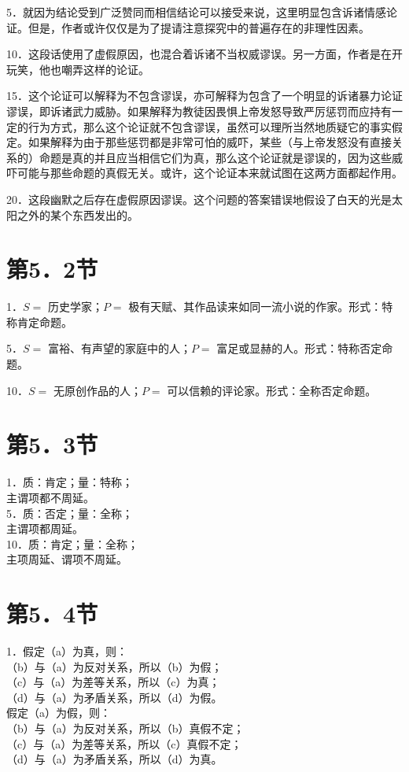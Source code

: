 5．就因为结论受到广泛赞同而相信结论可以接受来说，这里明显包含诉诸情感论证。但是，作者或许仅仅是为了提请注意探究中的普遍存在的非理性因素。

10．这段话使用了虚假原因，也混合着诉诸不当权威谬误。另一方面，作者是在开玩笑，他也嘲弄这样的论证。

15．这个论证可以解释为不包含谬误，亦可解释为包含了一个明显的诉诸暴力论证谬误，即诉诸武力威胁。如果解释为教徒因畏惧上帝发怒导致严厉惩罚而应持有一定的行为方式，那么这个论证就不包含谬误，虽然可以理所当然地质疑它的事实假定。如果解释为由于那些惩罚都是非常可怕的威吓，某些（与上帝发怒没有直接关系的）命题是真的并且应当相信它们为真，那么这个论证就是谬误的，因为这些威吓可能与那些命题的真假无关。或许，这个论证本来就试图在这两方面都起作用。

20．这段幽默之后存在虚假原因谬误。这个问题的答案错误地假设了白天的光是太阳之外的某个东西发出的。

\section*{第5．2节}
1．$S=$ 历史学家；$P=$ 极有天赋、其作品读来如同一流小说的作家。形式：特称肯定命题。

5．$S=$ 富裕、有声望的家庭中的人；$P=$ 富足或显赫的人。形式：特称否定命题。

10．$S=$ 无原创作品的人；$P=$ 可以信赖的评论家。形式：全称否定命题。

\section*{第5．3节}
1．质：肯定；量：特称；\\
主谓项都不周延。\\
5．质：否定；量：全称；\\
主谓项都周延。\\
10．质：肯定；量：全称；\\
主项周延、谓项不周延。

\section*{第5．4节}
1．假定（a）为真，则：\\
（b）与（a）为反对关系，所以（b）为假；\\
（c）与（a）为差等关系，所以（c）为真；\\
（d）与（a）为矛盾关系，所以（d）为假。\\
假定（a）为假，则：\\
（b）与（a）为反对关系，所以（b）真假不定；\\
（c）与（a）为差等关系，所以（c）真假不定；\\
（d）与（a）为矛盾关系，所以（d）为真。


